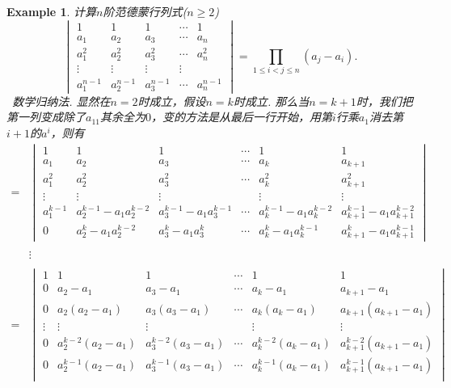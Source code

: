\documentclass{article}
\newtheorem{example}[theorem]{Example}
\newcommand{\hints}{{\color{blue} \text{hints}}}
\begin{document}
\begin{example}
\rm 计算$n$阶{\color{red}范德蒙行列式}($n \geq 2$)
$$
\begin{vmatrix}
1 & 1 & 1 & \cdots & 1\\
a_1 & a_2 & a_3 & \cdots & a_n \\
a_1^2 & a_2^2 & a_3^2 & \cdots & a_n^2 \\
\vdots& \vdots& \vdots& \vdots & \\
a_1^{n-1} & a_2^{n-1} & a_3^{n-1} & \cdots & a_n^{n-1} 
\end{vmatrix} = \prod\limits_{1 \leq i < j \leq n}(a_j-a_i).
$$
\hints\ 数学归纳法.
显然在$n=2$时成立，假设$n=k$时成立. 那么当$n=k+1$时，我们把第一列变成除了$a_{11}$其余全为$0$，变的方法是从最后一行开始，用第$i$行乘$a_1$消去第$i+1$的$a^i$，则有
$$
\begin{array}{ll}
=&\begin{vmatrix}
1 & 1 & 1 & \cdots & 1 & 1\\
a_1 & a_2 & a_3 & \cdots & a_k & a_{k+1} \\
a_1^2 & a_2^2 & a_3^2 & \cdots & a_k^2 & a_{k+1}^2\\
\vdots& \vdots& \vdots&  & \vdots &\vdots \\
a_1^{k-1} & a_2^{k-1}-a_1a_2^{k-2} & a_3^{k-1}-a_1a_3^{k-1} & \cdots & a_k^{k-1}-a_1a_k^{k-2} & a_{k+1}^{k-1} - a_1a_{k+1}^{k-2} \\
0 & a_2^{k}-a_1a_2^{k-2} & a_3^{k}-a_1a_3^{k} & \cdots & a_k^{k}-a_1a_k^{k-1} & a_{k+1}^{k} - a_1a_{k+1}^{k-1} 
\end{vmatrix} \\ \\
&\vdots \\ \\
=& 
\begin{vmatrix}
1 & 1 & 1 & \cdots & 1 & 1\\
0 & a_2-a_1 & a_3-a_1 & \cdots & a_k-a_1 & a_{k+1}-a_1 \\
0 & a_2(a_2-a_1) & a_3(a_3-a_1) & \cdots & a_k(a_k-a_1) & a_{k+1}(a_{k+1}-a_1) \\
\vdots& \vdots& \vdots &  & \vdots & \vdots \\
0 & a_2^{k-2}(a_2-a_1) & a_3^{k-2}(a_3-a_1) & \cdots & a_k^{k-2}(a_k - a_1) & a_{k+1}^{k-2}(a_{k+1}-a_1) \\
0 & a_2^{k-1}(a_2-a_1) & a_3^{k-1}(a_3-a_1) & \cdots & a_{k}^{k-1}(a_{k} - a_1) & a_{k+1}^{k-1}(a_{k+1}-a_1) \\
\end{vmatrix} \\ \\

\end{array}$$
\end{example}
\end{document}
